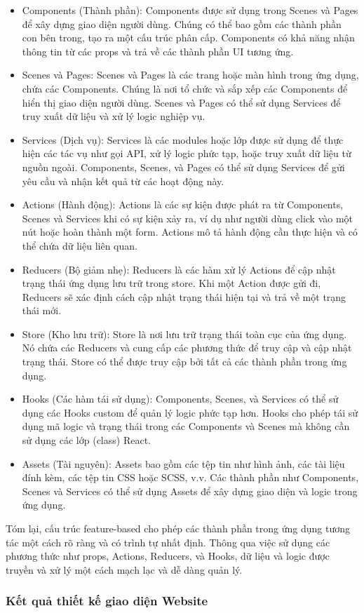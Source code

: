 \begin{itemize}
    \item Components (Thành phần): Components được sử dụng trong Scenes và Pages để xây dựng giao diện người dùng. Chúng có thể bao gồm các thành phần con bên trong, tạo ra một cấu trúc phân cấp. Components có khả năng nhận thông tin từ các props và trả về các thành phần UI tương ứng.
    \item Scenes và Pages: Scenes và Pages là các trang hoặc màn hình trong ứng dụng, chứa các Components. Chúng là nơi tổ chức và sắp xếp các Components để hiển thị giao diện người dùng. Scenes và Pages có thể sử dụng Services để truy xuất dữ liệu và xử lý logic nghiệp vụ.
    \item Services (Dịch vụ): Services là các modules hoặc lớp được sử dụng để thực hiện các tác vụ như gọi API, xử lý logic phức tạp, hoặc truy xuất dữ liệu từ nguồn ngoài. Components, Scenes, và Pages có thể sử dụng Services để gửi yêu cầu và nhận kết quả từ các hoạt động này.
    \item Actions (Hành động): Actions là các sự kiện được phát ra từ Components, Scenes và Services khi có sự kiện xảy ra, ví dụ như người dùng click vào một nút hoặc hoàn thành một form. Actions mô tả hành động cần thực hiện và có thể chứa dữ liệu liên quan.
    \item Reducers (Bộ giảm nhẹ): Reducers là các hàm xử lý Actions để cập nhật trạng thái ứng dụng lưu trữ trong store. Khi một Action được gửi đi, Reducers sẽ xác định cách cập nhật trạng thái hiện tại và trả về một trạng thái mới.
    \item Store (Kho lưu trữ): Store là nơi lưu trữ trạng thái toàn cục của ứng dụng. Nó chứa các Reducers và cung cấp các phương thức để truy cập và cập nhật trạng thái. Store có thể được truy cập bởi tất cả các thành phần trong ứng dụng.
    \item Hooks (Các hàm tái sử dụng): Components, Scenes, và Services có thể sử dụng các Hooks custom để quản lý logic phức tạp hơn. Hooks cho phép tái sử dụng mã logic và trạng thái trong các Components và Scenes mà không cần sử dụng các lớp (class) React.
    \item Assets (Tài nguyên): Assets bao gồm các tệp tin như hình ảnh, các tài liệu đính kèm, các tệp tin CSS hoặc SCSS, v.v. Các thành phần như Components, Scenes và Services có thể sử dụng Assets để xây dựng giao diện và logic trong ứng dụng.
\end{itemize}

Tóm lại, cấu trúc feature-based cho phép các thành phần trong ứng dụng tương tác một cách rõ ràng và có trình tự nhất định. Thông qua việc sử dụng các phương thức như props, Actions, Reducers, và Hooks, dữ liệu và logic được truyền và xử lý một cách mạch lạc và dễ dàng quản lý.

\subsubsection{Kết quả thiết kế giao diện Website}
